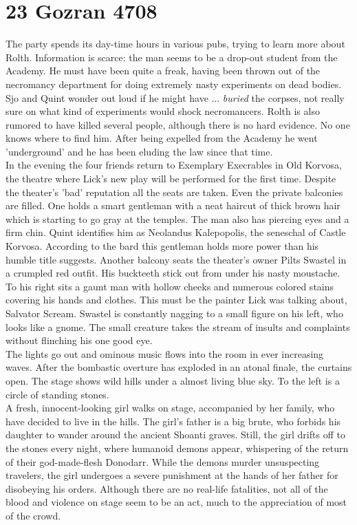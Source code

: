 \section{23 Gozran 4708}

The party spends its day-time hours in various pubs, trying to learn more about Rolth. Information is scarce: the man seems to be a drop-out student from the Academy. He must have been quite a freak, having been thrown out of the necromancy department for doing extremely nasty experiments on dead bodies. Sjo and Quint wonder out loud if he might have ... {\itshape buried} the corpses, not really sure on what kind of experiments would shock necromancers. Rolth is also rumored to have killed several people, although there is no hard evidence. No one knows where to find him. After being expelled from the Academy he went 'underground' and he has been eluding the law since that time.\\

In the evening the four friends return to Exemplary Execrables in Old Korvosa, the theatre where Lick's new play will be performed for the first time. Despite the theater's 'bad' reputation all the seats are taken. Even the private balconies are filled. One holds a smart gentleman with a neat haircut of thick brown hair which is starting to go gray at the temples. The man also has piercing eyes and a firm chin. Quint identifies him as Neolandus Kalepopolis, the seneschal of Castle Korvosa. According to the bard this gentleman holds more power than his humble title suggests. Another balcony seats the theater's owner Pilts Swastel in a crumpled red outfit. His buckteeth stick out from under his nasty moustache. To his right sits a gaunt man with hollow cheeks and numerous colored stains covering his hands and clothes. This must be the painter Lick was talking about, Salvator Scream. Swastel is constantly nagging to a small figure on his left, who looks like a gnome. The small creature takes the stream of insults and complaints without flinching his one good eye.\\

The lights go out and ominous music flows into the room in ever increasing waves. After the bombastic overture has exploded in an atonal finale, the curtains open. The stage shows wild hills under a almost living blue sky. To the left is a circle of standing stones.\\

A fresh, innocent-looking girl walks on stage, accompanied by her family, who have decided to live in the hills. The girl's father is a big brute, who forbids his daughter to wander around the ancient Shoanti graves. Still, the girl drifts off to the stones every night, where humanoid demons appear, whispering of the return of their god-made-flesh Donodarr. While the demons murder unsuspecting travelers, the girl undergoes a severe punishment at the hands of her father for disobeying his orders. Although there are no real-life fatalities, not all of the blood and violence on stage seem to be an act, much to the appreciation of most of the crowd.\\

